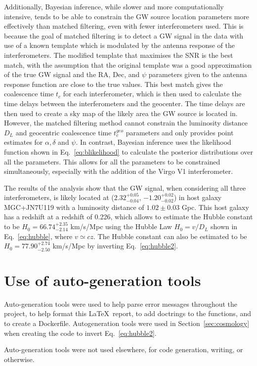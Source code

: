\documentclass[11pt,a4paper]{article}
\begin{document}
Additionally, Bayesian inference, while slower and more computationally intensive, tends to be able to constrain the GW source location parameters more effectively than matched filtering, even with fewer interferometers used. This is because the goal of matched filtering is to detect a GW signal in the data with use of a known template which is modulated by the antenna response of the interferometers. The modified template that maximises the SNR is the best match, with the assumption that the original template was a good approximation of the true GW signal and the RA, Dec, and $\psi$ parameters given to the antenna response function are close to the true values. This best match gives the coalescence time $t_c$ for each interferometer, which is then used to calculate the time delays between the interferometers and the geocenter. The time delays are then used to create a sky map of the likely area the GW source is located in. However, the matched filtering method cannot constrain the luminosity distance $D_L$ and geocentric coalescence time $t_c^{geo}$ parameters and only provides point estimates for $\alpha, \delta$ and $\psi$. In contrast, Bayesian inference uses the likelihood function shown in Eq.~\ref{eq:blikelihood} to calculate the posterior distributions over all the parameters. This allows for all the parameters to be constrained simultaneously, especially with the addition of the Virgo V1 interferometer.

The results of the analysis show that the GW signal, when considering all three interferometers, is likely located at ($2.32^{+0.05}_{-0.04}$, $-1.20^{+0.02}_{-0.02}$) in host galaxy MGC+JN7U119 with a luminosity distance of $1.02 \pm 0.03$ Gpc. This host galaxy has a redshift at a redshift of 0.226, which allows to estimate the Hubble constant to be $H_0=66.74^{+2.35}_{-2.14}$ km/s/Mpc using the Hubble Law $H_0=v/D_L$ shown in Eq.~\ref{eq:hubble}, where $v\simeq cz$. The Hubble constant can also be estimated to be $H_0=77.90^{+2.74}_{-2.50}$ km/s/Mpc by inverting Eq.~\ref{eq:hubble2}.

\clearpage


\appendix
\section{Use of auto-generation tools}
Auto-generation tools were used to help parse error messages throughout the project, to help format this \LaTeX\ report, to add doctrings to the functions, and to create a Dockerfile. Autogeneration tools were used in Section~\ref{sec:cosmology} when creating the code to invert Eq.~\ref{eq:hubble2}.

Auto-generation tools were not used elsewhere, for code generation, writing, or otherwise.
\end{document}
